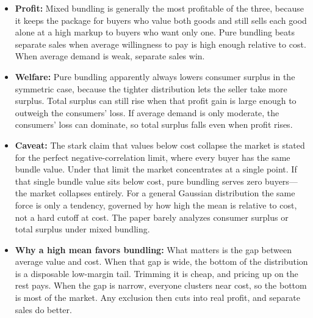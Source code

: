 \documentclass[12pt]{article}
\begin{document}
\begin{itemize}
\begin{itemize}
      \item \textbf{Profit:} Mixed bundling is generally the most profitable of the three, because it keeps the package for buyers who value both goods and still sells each good alone at a high markup to buyers who want only one. Pure bundling beats separate sales when average willingness to pay is high enough relative to cost. When average demand is weak, separate sales win.
      \item \textbf{Welfare:} Pure bundling apparently always lowers consumer surplus in the symmetric case, because the tighter distribution lets the seller take more surplus. Total surplus can still rise when that profit gain is large enough to outweigh the consumers' loss. If average demand is only moderate, the consumers' loss can dominate, so total surplus falls even when profit rises.
      \item \textbf{Caveat:} The stark claim that values below cost collapse the market is stated for the perfect negative-correlation limit, where every buyer has the same bundle value. Under that limit the market concentrates at a single point. If that single bundle value sits below cost, pure bundling serves zero buyers---the market collapses entirely. For a general Gaussian distribution the same force is only a tendency, governed by how high the mean is relative to cost, not a hard cutoff at cost. The paper barely analyzes consumer surplus or total surplus under mixed bundling.
      \item \textbf{Why a high mean favors bundling:} What matters is the gap between average value and cost. When that gap is wide, the bottom of the distribution is a disposable low-margin tail. Trimming it is cheap, and pricing up on the rest pays. When the gap is narrow, everyone clusters near cost, so the bottom is most of the market. Any exclusion then cuts into real profit, and separate sales do better.
    \end{itemize}
\end{itemize}
\end{document}
